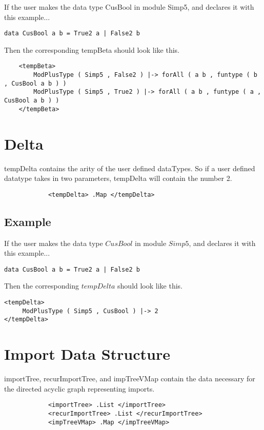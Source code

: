 If the user makes the data type CusBool in module Simp5, and declares it with this example...
\begin{lstlisting}
data CusBool a b = True2 a | False2 b
\end{lstlisting}

Then the corresponding tempBeta should look like this.
\begin{lstlisting}
    <tempBeta>
        ModPlusType ( Simp5 , False2 ) |-> forAll ( a b , funtype ( b , CusBool a b ) )
        ModPlusType ( Simp5 , True2 ) |-> forAll ( a b , funtype ( a , CusBool a b ) )
    </tempBeta>

\end{lstlisting}

\section{Delta}

tempDelta contains the arity of the user defined dataTypes. So if a user defined datatype takes in two parameters, tempDelta will contain the number 2.

\begin{lstlisting}
            <tempDelta> .Map </tempDelta>
\end{lstlisting}

\subsection{Example}
If the user makes the data type $CusBool$ in module $Simp5$, and declares it with this example...
\begin{lstlisting}
data CusBool a b = True2 a | False2 b
\end{lstlisting}

Then the corresponding $tempDelta$ should look like this.

\begin{lstlisting}
<tempDelta>
     ModPlusType ( Simp5 , CusBool ) |-> 2
</tempDelta>
\end{lstlisting}

\section{Import Data Structure}

importTree, recurImportTree, and impTreeVMap contain the data necessary for the directed acyclic graph representing imports.

\begin{lstlisting}
            <importTree> .List </importTree>
            <recurImportTree> .List </recurImportTree>
            <impTreeVMap> .Map </impTreeVMap>
\end{lstlisting}

